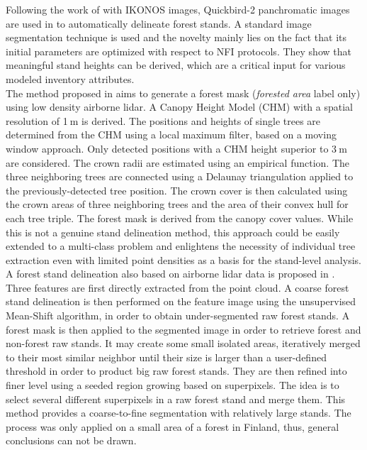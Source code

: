 Following the work of \citep{Wulder2008} with IKONOS images, Quickbird-2 panchromatic images are used in \citep{Mora20102474} to automatically delineate forest stands. A standard image segmentation technique is used and the novelty mainly lies on the fact that its initial parameters are optimized with respect to NFI protocols. They show that meaningful stand heights can be derived, which are a critical input for various modeled inventory attributes.\\
The method proposed in \citep{eysn2012forest} aims to generate a forest mask (\textit{forested area} label only) using low density airborne lidar. A Canopy Height Model (CHM) with a spatial resolution of 1$\:$m is derived. The positions and heights of single trees are determined from the CHM using a local maximum filter, based on a moving window approach. Only detected positions with a CHM height superior to 3$\:$m are considered. The crown radii are estimated using an empirical function. The three neighboring trees are connected using a Delaunay triangulation applied to the previously-detected tree position. The crown cover is then calculated using the crown areas of three neighboring trees and the area of their convex hull for each tree triple. The forest mask is derived from the canopy cover values. While this is not a genuine stand delineation method, this approach could be easily extended to a multi-class problem and enlightens the necessity of individual tree extraction even with limited point densities as a basis for the stand-level analysis.\\
A forest stand delineation also based on airborne lidar data is proposed in \citep{wu2014data}. Three features are first directly extracted from the point cloud. A coarse forest stand delineation is then performed on the feature image using the unsupervised Mean-Shift algorithm, in order to obtain under-segmented raw forest stands. A forest mask is then applied to the segmented image in order to retrieve forest and non-forest raw stands. It may create some small isolated areas, iteratively merged to their most similar neighbor until their size is larger than a user-defined threshold in order to product big raw forest stands. They are then refined into finer level using a seeded region growing based on superpixels. The idea is to select several different superpixels in a raw forest stand and merge them. This method provides a coarse-to-fine segmentation with relatively large stands. The process was only applied on a small area of a forest in Finland, thus, general conclusions can not be drawn. \\

